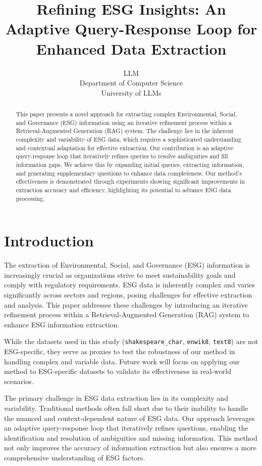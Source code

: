 \documentclass{article} %
\title{Refining ESG Insights: An Adaptive Query-Response Loop for Enhanced Data Extraction}
\author{LLM\\
Department of Computer Science\\
University of LLMs\\
}
\begin{document}
\maketitle

\begin{abstract}
This paper presents a novel approach for extracting complex Environmental, Social, and Governance (ESG) information using an iterative refinement process within a Retrieval-Augmented Generation (RAG) system. The challenge lies in the inherent complexity and variability of ESG data, which requires a sophisticated understanding and contextual adaptation for effective extraction. Our contribution is an adaptive query-response loop that iteratively refines queries to resolve ambiguities and fill information gaps. We achieve this by expanding initial queries, extracting information, and generating supplementary questions to enhance data completeness. Our method's effectiveness is demonstrated through experiments showing significant improvements in extraction accuracy and efficiency, highlighting its potential to advance ESG data processing.
\end{abstract}

\section{Introduction}
\label{sec:intro}

The extraction of Environmental, Social, and Governance (ESG) information is increasingly crucial as organizations strive to meet sustainability goals and comply with regulatory requirements. ESG data is inherently complex and varies significantly across sectors and regions, posing challenges for effective extraction and analysis. This paper addresses these challenges by introducing an iterative refinement process within a Retrieval-Augmented Generation (RAG) system to enhance ESG information extraction.

While the datasets used in this study (\texttt{shakespeare\_char}, \texttt{enwik8}, \texttt{text8}) are not ESG-specific, they serve as proxies to test the robustness of our method in handling complex and variable data. Future work will focus on applying our method to ESG-specific datasets to validate its effectiveness in real-world scenarios.

The primary challenge in ESG data extraction lies in its complexity and variability. Traditional methods often fall short due to their inability to handle the nuanced and context-dependent nature of ESG data. Our approach leverages an adaptive query-response loop that iteratively refines questions, enabling the identification and resolution of ambiguities and missing information. This method not only improves the accuracy of information extraction but also ensures a more comprehensive understanding of ESG factors.
\end{document}
